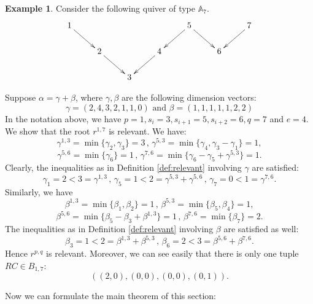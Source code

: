 \documentclass[twoside]{article}
\newcommand{\A}{\mathbb{A}}
\theoremstyle{definition}
\newtheorem{example}[theorem]{Example}
\begin{document}
\begin{example}\label{ex:main}
Consider the following quiver of type $\A_7$.
\[\xymatrix@R=1.5pc{
1 \ar[dr] & & & & 5 \ar[dl]\ar[dr] & &7 \ar[dl]\\
& 2 \ar[dr] & & 4 \ar[dl] & & 6 &\\
& & 3 & & & &
}\]

Suppose $\alpha=\gamma+\beta$, where $\gamma,\beta$ are the following dimension vectors:
\[\gamma = (2,4,3,2,1,1,0) \mbox{ and } \beta = (1,1,1,1,1,2,2)\]
In the notation above, we have $p=1,s_i=3,s_{i+1}=5,s_{i+2}=6, q =7$ and $e=4$. We show that the root $r^{1,7}$ is relevant. We have:
\[\gamma^{1,3} = \min\{\gamma_2,\gamma_3\}=3 \, , \, \gamma^{5,3}=\min\{\gamma_4,\gamma_3-\gamma_1\}=1,\]
\[\gamma^{5,6} = \min\{\gamma_6\}=1 \,,\,\gamma^{7,6} = \min\{\gamma_6-\gamma_5+\gamma^{5,3}\}=1.\]
Clearly, the inequalities as in Definition \ref{def:relevant} involving $\gamma$ are satisfied:
\[\gamma_1 = 2 < 3 = \gamma^{1,3} \, , \, \gamma_5 =1 < 2 =\gamma^{5,3}+\gamma^{5,6} \, , \, \gamma_7 = 0 < 1= \gamma^{7,6}.\]
Similarly, we have
\[\beta^{1,3} = \min\{ \beta_1,\beta_2\} = 1 \,,\, \beta^{5,3} = \min\{\beta_5,\beta_4\} = 1, \]
\[\beta^{5,6} = \min\{\beta_5-\beta_3+\beta^{1,3}\} = 1\,,\, \beta^{7,6}=\min\{\beta_7\} = 2.\]
The inequalities as in Definition \ref{def:relevant} involving $\beta$ are satisfied as well:
\[\beta_3 = 1 <  2 = \beta^{1,3}+\beta^{5,3}\,,\, \beta_6 = 2 < 3 = \beta^{5,6}+\beta^{7,6}.\]
Hence $r^{p,q}$ is relevant. Moreover, we can see easily that there is only one tuple $RC\in B_{1,7}$:
\[((2,0),(0,0),(0,0),(0,1)).\]

\end{example}

Now we can formulate the main theorem of this section:
\end{document}
